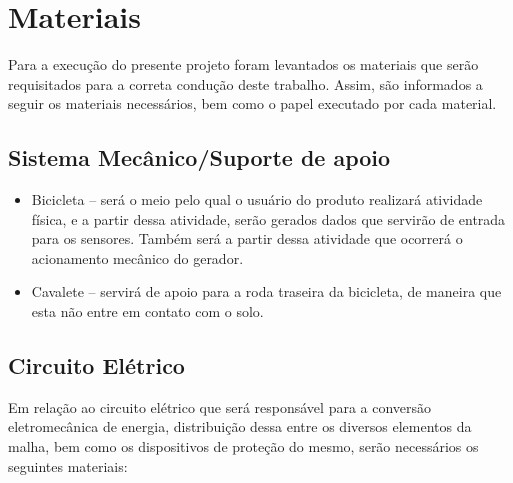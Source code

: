 \chapter[Materiais]{Materiais}

Para a execução do presente projeto foram levantados os materiais que serão requisitados para a correta condução deste trabalho. Assim, são informados a seguir 
os materiais necessários, bem como o papel executado por cada material.

\section{Sistema Mecânico/Suporte de apoio}

\begin{itemize}
\item Bicicleta – será o meio pelo qual o usuário do produto realizará atividade física, e a partir dessa atividade, serão gerados dados que servirão de 
  entrada para os sensores. Também será a partir dessa atividade que ocorrerá o acionamento mecânico do gerador.
\item Cavalete – servirá de apoio para a roda traseira da bicicleta, de maneira que esta não entre em contato com o solo.
\end{itemize}

\section{Circuito Elétrico}

Em relação ao circuito elétrico que será responsável para a conversão eletromecânica de energia, distribuição dessa entre os diversos elementos da malha, 
bem como os dispositivos de proteção do mesmo, serão necessários os seguintes materiais:

